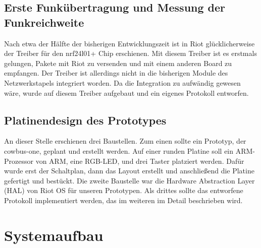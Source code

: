 \documentclass{IEEEtran}
\begin{document}
    \subsection{Erste Funkübertragung und Messung der Funkreichweite}
        Nach etwa der Hälfte der bisherigen Entwicklungszeit ist in Riot 
        glücklicherweise der Treiber für den nrf24l01+ Chip erschienen. Mit 
        diesem Treiber ist es erstmals gelungen, Pakete mit Riot zu versenden 
        und mit einem anderen Board zu empfangen.
        Der Treiber ist allerdings nicht in die bisherigen Module des 
        Netzwerkstapels integriert worden. Da die Integration zu aufwändig 
        gewesen wäre, wurde auf diesem Treiber aufgebaut und ein eigenes 
        Protokoll entworfen.

    \subsection{Platinendesign des Prototypes}
    An dieser Stelle erschienen drei Baustellen. Zum einen sollte ein Prototyp, 
    der cowbus-one, geplant und erstellt werden. Auf einer runden Platine soll 
    ein ARM-Prozessor von ARM, eine RGB-LED, und drei Taster platziert werden. 
    Dafür wurde erst der Schaltplan, dann das Layout erstellt und anschließend 
    die Platine gefertigt und bestückt.
    Die zweite Baustelle war die Hardware Abstraction Layer (HAL) von Riot OS 
    für unseren Prototypen. Als drittes sollte das entworfene Protokoll 
    implementiert werden, das im weiteren im Detail beschrieben wird.

    



\section{Systemaufbau}
\end{document}
